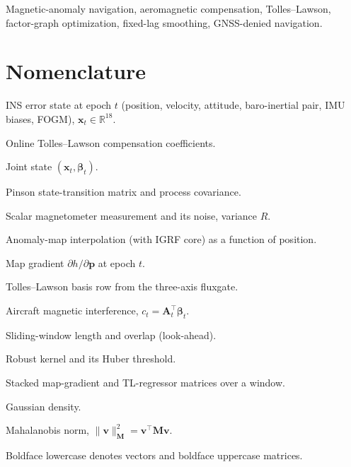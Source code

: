 \documentclass{IEEEtaes}
\begin{document}
\begin{IEEEkeywords}
Magnetic-anomaly navigation, aeromagnetic compensation, Tolles--Lawson,
factor-graph optimization, fixed-lag smoothing, GNSS-denied navigation.
\end{IEEEkeywords}

\section*{Nomenclature}
\begin{IEEEdescription}
\item[$\mathbf{x}_t$] INS error state at epoch $t$ (position, velocity, attitude,
baro-inertial pair, IMU biases, FOGM), $\mathbf{x}_t\in\mathbb{R}^{18}$.
\item[$\boldsymbol{\beta}_t$] Online Tolles--Lawson compensation coefficients.
\item[$\boldsymbol{\chi}_t$] Joint state $(\mathbf{x}_t,\boldsymbol{\beta}_t)$.
\item[$\boldsymbol{\Phi}_t,\mathbf{Q}_t$] Pinson state-transition matrix and process
covariance.
\item[$z_t,\,\eta_t$] Scalar magnetometer measurement and its noise, variance $R$.
\item[$h(\cdot)$] Anomaly-map interpolation (with IGRF core) as a function of
position.
\item[$\mathbf{g}_t$] Map gradient $\partial h/\partial\mathbf{p}$ at epoch $t$.
\item[$\mathbf{A}_t$] Tolles--Lawson basis row from the three-axis fluxgate.
\item[$c_t$] Aircraft magnetic interference, $c_t=\mathbf{A}_t^{\top}\boldsymbol{\beta}_t$.
\item[$L_w,\,L_o$] Sliding-window length and overlap (look-ahead).
\item[$\rho,\,\delta$] Robust kernel and its Huber threshold.
\item[$\mathbf{G},\boldsymbol{\Psi}$] Stacked map-gradient and TL-regressor matrices
over a window.
\item[$\mathcal{N}(\cdot,\cdot)$] Gaussian density.
\item[$\lVert\cdot\rVert_{\mathbf{M}}$] Mahalanobis norm,
$\lVert\mathbf{v}\rVert^2_{\mathbf{M}}=\mathbf{v}^{\top}\mathbf{M}\mathbf{v}$.
\end{IEEEdescription}

\noindent Boldface lowercase denotes vectors and boldface uppercase matrices.
\end{document}
